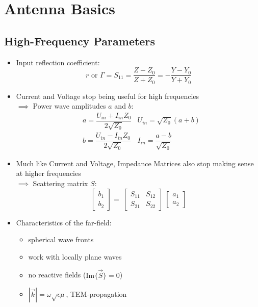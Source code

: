 \section{Antenna Basics}
\subsection{High-Frequency Parameters}
\begin{itemize}
    \itemsep0pt
    \item Input reflection coefficient:\\
        \[r \text{ or } \Gamma = S_{11} = \dfrac{Z - Z_0}{Z + Z_0} = -\dfrac{Y - Y_0}{Y + Y_0}\]
    \item Current and Voltage stop being useful for high frequencies\\
        $\implies$ Power wave amplitudes $a$ and $b$:
    \begin{align*}
        &a = \dfrac{U_{in} + I_{in}Z_0}{2\sqrt{Z_0}} & U_{in} = \sqrt{Z_0} (a + b)\\
        &b = \dfrac{U_{in} - I_{in}Z_0}{2\sqrt{Z_0}} & I_{in} = \dfrac{a - b}{\sqrt{Z_0}}
    \end{align*}
    \item Much like Current and Voltage, Impedance Matrices also stop making sense at higher frequencies\\
    $\implies$ Scattering matrix $S$:
        \[\begin{bmatrix}b_1\\ b_2\end{bmatrix} =\
            \begin{bmatrix}S_{11} & S_{12}\\ S_{21} & S_{22}\end{bmatrix} \
            \begin{bmatrix}a_1\\ a_2\end{bmatrix}\]
    \item Characteristics of the far-field:
        \begin{itemize}
            \itemsep0pt
            \item spherical wave fronts
            \item work with locally plane waves
            \item no reactive fields (\(\mathrm{Im}\{\vec{S}\} = 0\))
            \item \(|\vec{k}| = \omega \sqrt{\epsilon\mu}\), TEM-propagation
        \end{itemize}

\end{itemize}

